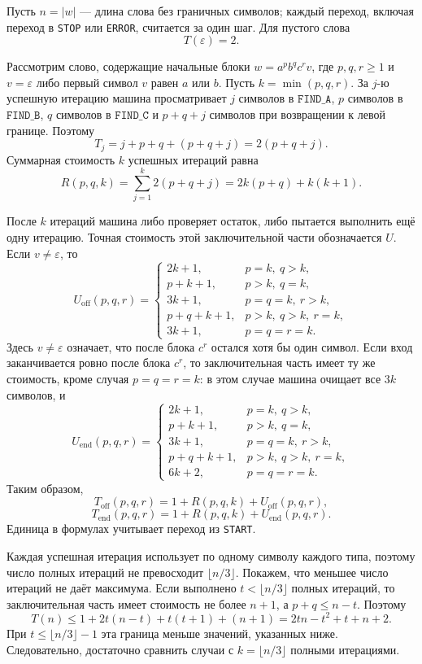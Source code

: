 \documentclass[12pt]{article}
\begin{document}
Пусть $n=|w|$ --- длина слова без граничных символов;
каждый переход, включая переход в \texttt{STOP} или \texttt{ERROR},
считается за один шаг. Для пустого слова
\[
T(\varepsilon)=2.
\]

Рассмотрим слово, содержащие начальные блоки
$w=a^p b^q c^r v$, где $p,q,r\geq 1$ и $v=\varepsilon$ либо
первый символ $v$ равен $a$ или $b$. Пусть
$k=\min(p,q,r)$. За $j$-ю успешную итерацию машина
просматривает $j$ символов в $\texttt{FIND\_A}$,
$p$ символов в $\texttt{FIND\_B}$,
$q$ символов в $\texttt{FIND\_C}$ и
$p+q+j$ символов при возвращении к левой границе. Поэтому
\[
T_j=j+p+q+(p+q+j)=2(p+q+j).
\]
Суммарная стоимость $k$ успешных итераций равна
\[
R(p,q,k)=\sum_{j=1}^{k}2(p+q+j)
       =2k(p+q)+k(k+1).
\]

После $k$ итераций машина либо проверяет остаток, либо пытается
выполнить ещё одну итерацию. Точная стоимость этой заключительной
части обозначается $U$. Если $v\ne\varepsilon$, то
\[
U_{\mathrm{off}}(p,q,r)=
\begin{cases}
2k+1, & p=k,\ q>k,\\
p+k+1, & p>k,\ q=k,\\
3k+1, & p=q=k,\ r>k,\\
p+q+k+1, & p>k,\ q>k,\ r=k,\\
3k+1, & p=q=r=k.
\end{cases}
\]
Здесь $v\ne\varepsilon$ означает, что после блока $c^r$ остался
хотя бы один символ. Если вход заканчивается ровно после блока
$c^r$, то заключительная часть имеет ту же стоимость, кроме
случая $p=q=r=k$: в этом случае машина очищает все $3k$ символов,
и
\[
U_{\mathrm{end}}(p,q,r)=
\begin{cases}
2k+1, & p=k,\ q>k,\\
p+k+1, & p>k,\ q=k,\\
3k+1, & p=q=k,\ r>k,\\
p+q+k+1, & p>k,\ q>k,\ r=k,\\
6k+2, & p=q=r=k.
\end{cases}
\]
Таким образом,
\[
T_{\mathrm{off}}(p,q,r)=1+R(p,q,k)+U_{\mathrm{off}}(p,q,r),
\]
\[
T_{\mathrm{end}}(p,q,r)=1+R(p,q,k)+U_{\mathrm{end}}(p,q,r).
\]
Единица в формулах учитывает переход из \texttt{START}.

Каждая успешная итерация использует по одному символу каждого типа,
поэтому число полных итераций не превосходит $\lfloor n/3\rfloor$.
Покажем, что меньшее число итераций не даёт максимума. Если выполнено
$t<\lfloor n/3\rfloor$ полных итераций, то заключительная часть имеет
стоимость не более $n+1$, а $p+q\le n-t$. Поэтому
\[
T(n)\le 1+2t(n-t)+t(t+1)+(n+1)
      =2tn-t^2+t+n+2.
\]
При $t\le \lfloor n/3\rfloor-1$ эта граница меньше значений,
указанных ниже. Следовательно, достаточно сравнить случаи с
$k=\lfloor n/3\rfloor$ полными итерациями.
\end{document}
